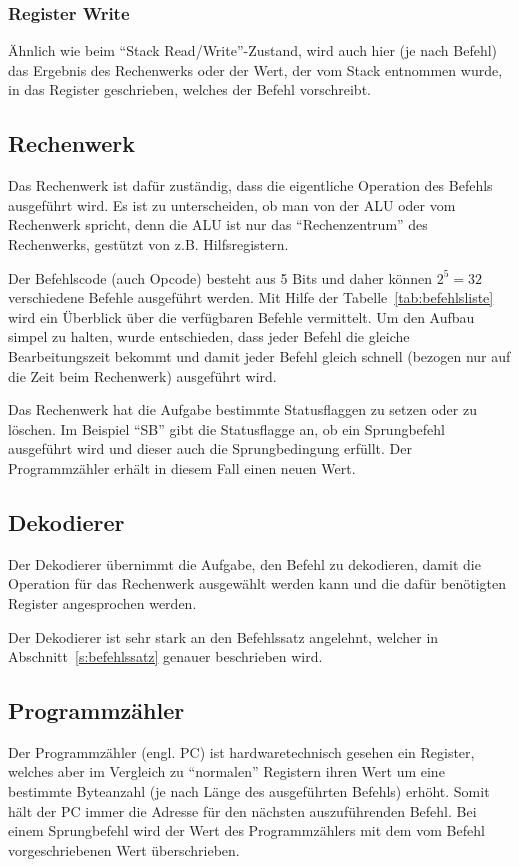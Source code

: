 \subsubsection{Register Write}
Ähnlich wie beim "`Stack Read/Write"'-Zustand, wird auch hier (je nach Befehl) das
Ergebnis des Rechenwerks oder der Wert, der vom Stack entnommen wurde, in das
Register geschrieben, welches der Befehl vorschreibt.
\subsection{Rechenwerk}
\label{s:alu}
Das Rechenwerk ist dafür zuständig, dass die eigentliche Operation des Befehls
ausgeführt wird. Es ist zu unterscheiden, ob man von der \ac{ALU} oder vom
Rechenwerk spricht, denn die \ac{ALU} ist nur das "`Rechenzentrum"' des
Rechenwerks, gestützt von z.B. Hilfsregistern.

Der Befehlscode (auch Opcode) besteht aus 5 Bits und daher können $2^{5} = 32$
verschiedene Befehle ausgeführt werden. Mit Hilfe der
Tabelle~\ref{tab:befehlsliste} wird ein Überblick über die verfügbaren Befehle
vermittelt. Um den Aufbau simpel zu halten, wurde entschieden, dass jeder
Befehl die gleiche Bearbeitungszeit bekommt und damit jeder Befehl gleich
schnell (bezogen nur auf die Zeit beim Rechenwerk) ausgeführt wird.

Das Rechenwerk hat die Aufgabe bestimmte Statusflaggen zu setzen oder zu
löschen. Im Beispiel "`SB"' gibt die Statusflagge an, ob ein Sprungbefehl
ausgeführt wird und dieser auch die Sprungbedingung erfüllt. Der Programmzähler
erhält in diesem Fall einen neuen Wert.
\clearpage
\pagebreak
\subsection{Dekodierer}
\label{s:decode}
Der Dekodierer übernimmt die Aufgabe, den Befehl zu dekodieren, damit die
Operation für das Rechenwerk ausgewählt werden kann und die dafür benötigten
Register angesprochen werden.

Der Dekodierer ist sehr stark an den Befehlssatz angelehnt, welcher in
Abschnitt~\ref{s:befehlssatz} genauer beschrieben wird.
\subsection{Programmzähler}
\label{s:pc}
Der Programmzähler (engl. \ac{PC}) ist hardwaretechnisch gesehen ein Register,
welches aber im Vergleich zu "`normalen"' Registern ihren Wert um eine bestimmte
Byteanzahl (je nach Länge des ausgeführten Befehls) erhöht. Somit hält der \ac{PC}
immer die Adresse für den nächsten auszuführenden Befehl. Bei einem Sprungbefehl
wird der Wert des Programmzählers mit dem vom Befehl vorgeschriebenen Wert
überschrieben.


